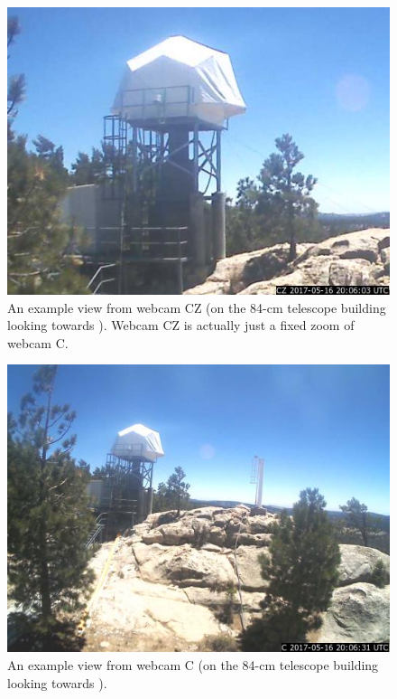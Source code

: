 \begin{figure}
\begin{center}
\includegraphics[width=0.8\linewidth]{figures/interface-coatlioan-webcam-cz.jpg}
\end{center}
\caption{An example view from webcam CZ (on the 84-cm telescope building looking towards {\projectname}). Webcam CZ is actually just a fixed zoom of webcam C.}
\label{figure:interface-webcam-cz}
\end{figure}

\begin{figure}
\begin{center}
\includegraphics[width=0.8\linewidth]{figures/interface-coatlioan-webcam-c.jpg}
\end{center}
\caption{An example view from webcam C (on the 84-cm telescope building looking towards {\projectname}).}
\label{figure:interface-webcam-c}
\end{figure}

\fi

\ifddotioan

